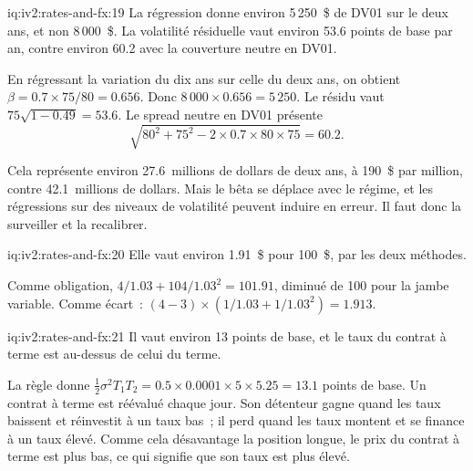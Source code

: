 \begin{solution}{iq:iv2:rates-and-fx:19}
La régression donne environ 5\,250~\$ de DV01 sur le deux ans, et non 8\,000~\$. La volatilité résiduelle vaut environ 53.6 points de base par an, contre environ 60.2 avec la couverture neutre en DV01.

En régressant la variation du dix ans sur celle du deux ans, on obtient $\beta = 0.7 \times 75/80 = 0.656$. Donc $8\,000 \times 0.656 = 5\,250$. Le résidu vaut $75\sqrt{1 - 0.49} = 53.6$. Le spread neutre en DV01 présente
\[
\sqrt{80^2 + 75^2 - 2 \times 0.7 \times 80 \times 75} = 60.2.
\]

Cela représente environ 27.6~millions de dollars de deux ans, à 190~\$ par million, contre 42.1~millions de dollars. Mais le bêta se déplace avec le régime, et les régressions sur des niveaux de volatilité peuvent induire en erreur. Il faut donc la surveiller et la recalibrer.

\end{solution}

\begin{solution}{iq:iv2:rates-and-fx:20}
Elle vaut environ 1.91~\$ pour 100~\$, par les deux méthodes.

Comme obligation, $4/1.03 + 104/1.03^2 = 101.91$, diminué de 100 pour la jambe variable. Comme écart~: $(4 - 3) \times (1/1.03 + 1/1.03^2) = 1.913$.

\end{solution}

\begin{solution}{iq:iv2:rates-and-fx:21}
Il vaut environ 13 points de base, et le taux du contrat à terme est au-dessus de celui du terme.

La règle donne $\tfrac12\sigma^2T_1T_2 = 0.5 \times 0.0001 \times 5 \times 5.25 = 13.1$ points de base. Un contrat à terme est réévalué chaque jour. Son détenteur gagne quand les taux baissent et réinvestit à un taux bas~; il perd quand les taux montent et se finance à un taux élevé. Comme cela désavantage la position longue, le prix du contrat à terme est plus bas, ce qui signifie que son taux est plus élevé.

\end{solution}

